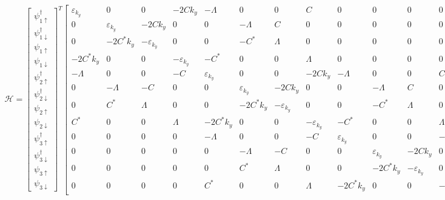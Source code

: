 \documentclass{jarticle}
\begin{document}
\begin{align}
\mathcal{H}=
\begin{bmatrix}
\psi_{1\uparrow}^\dagger \\ 
\psi_{1\downarrow}^\dagger \\ 
\psi_{1\uparrow} \\ 
\psi_{1\downarrow} \\ 
\psi_{2\uparrow}^\dagger \\ 
\psi_{2\downarrow}^\dagger \\ 
\psi_{2\uparrow} \\ 
\psi_{2\downarrow} \\ 
\psi_{3\uparrow}^\dagger \\ 
\psi_{3\downarrow}^\dagger \\ 
\psi_{3\uparrow} \\ 
\psi_{3\downarrow}
\end{bmatrix} 
^T
\begin{bmatrix}
\varepsilon_{k_y} & 0 & 0 & -2Ck_{y} & -\Lambda & 0 & 0 & C & 0 & 0 & 0 & 0 \\ 
0 & \varepsilon_{k_y} & -2Ck_{y} & 0 & 0 & -\Lambda & C & 0 & 0 & 0 & 0 & 0 \\ 
0 & -2C^{*}k_{y} & -\varepsilon_{k_y} & 0 & 0 & -C^{*} & \Lambda & 0 & 0 & 0 & 0 & 0 \\ 
-2C^{*}k_{y} & 0 & 0 & -\varepsilon_{k_y} & -C^{*} & 0 & 0 & \Lambda & 0 & 0 & 0 & 0 \\ 
-\Lambda & 0 & 0 & -C & \varepsilon_{k_y} & 0 & 0 & -2Ck_{y} & -\Lambda & 0 & 0 & C \\ 
0 & -\Lambda & -C & 0 & 0 & \varepsilon_{k_y} & -2Ck_{y} & 0 & 0 & -\Lambda & C & 0 \\ 
0 & C^{*} & \Lambda & 0 & 0 & -2C^{*}k_{y} & -\varepsilon_{k_y} & 0 & 0 & -C^{*} & \Lambda & 0 \\ 
C^{*} & 0 & 0 & \Lambda & -2C^{*}k_{y} & 0 & 0 & -\varepsilon_{k_y} & -C^{*} & 0 & 0 & \Lambda \\ 
0 & 0 & 0 & 0 & -\Lambda & 0 & 0 & -C & \varepsilon_{k_y} & 0 & 0 & -2Ck_{y} \\ 
0 & 0 & 0 & 0 & 0 & -\Lambda & -C & 0 & 0 & \varepsilon_{k_y} & -2Ck_{y} & 0 \\ 
0 & 0 & 0 & 0 & 0 & C^{*} & \Lambda & 0 & 0 & -2C^{*}k_{y} & -\varepsilon_{k_y} & 0 \\ 
0 & 0 & 0 & 0 & C^{*} & 0 & 0 & \Lambda & -2C^{*}k_{y} & 0 & 0 & -\varepsilon_{k_y}
\end{bmatrix} 
\begin{bmatrix}
\psi_{1\uparrow} \\ 

\end{bmatrix}
\end{align}
\end{document}
